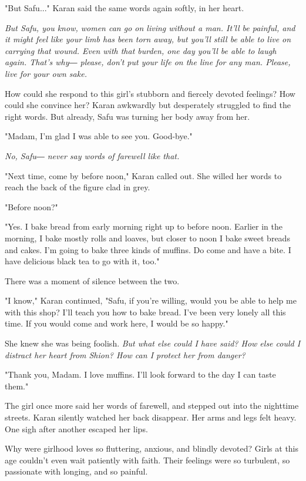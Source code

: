 "But Safu..." Karan said the same words again softly, in her heart.

\emph{But Safu, you know, women can go on living without a man. It'll be
painful, and it might feel like your limb has been torn away, but you'll
still be able to live on carrying that wound. Even with that burden, one
day you'll be able to laugh again. That's why― please, don't put your
life on the line for any man. Please, live for your own sake.}

How could she respond to this girl's stubborn and fiercely devoted
feelings? How could she convince her? Karan awkwardly but desperately
struggled to find the right words. But already, Safu was turning her
body away from her.

"Madam, I'm glad I was able to see you. Good-bye."

\emph{No, Safu― never say words of farewell like that.}

"Next time, come by before noon," Karan called out. She willed her words
to reach the back of the figure clad in grey.

"Before noon?"

"Yes. I bake bread from early morning right up to before noon. Earlier
in the morning, I bake mostly rolls and loaves, but closer to noon I
bake sweet breads and cakes. I'm going to bake three kinds of muffins.
Do come and have a bite. I have delicious black tea to go with it, too."

There was a moment of silence between the two.

"I know," Karan continued, "Safu, if you're willing, would you be able
to help me with this shop? I'll teach you how to bake bread. I've been
very lonely all this time. If you would come and work here, I would be
so happy."

She knew she was being foolish. \emph{But what else could I have said? How
else could I distract her heart from Shion? How can I protect her from
danger?}

"Thank you, Madam. I love muffins. I'll look forward to the day I can
taste them."

The girl once more said her words of farewell, and stepped out into the
nighttime streets. Karan silently watched her back disappear. Her arms
and legs felt heavy. One sigh after another escaped her lips.

Why were girlhood loves so fluttering, anxious, and blindly devoted?
Girls at this age couldn't even wait patiently with faith. Their
feelings were so turbulent, so passionate with longing, and so painful.

